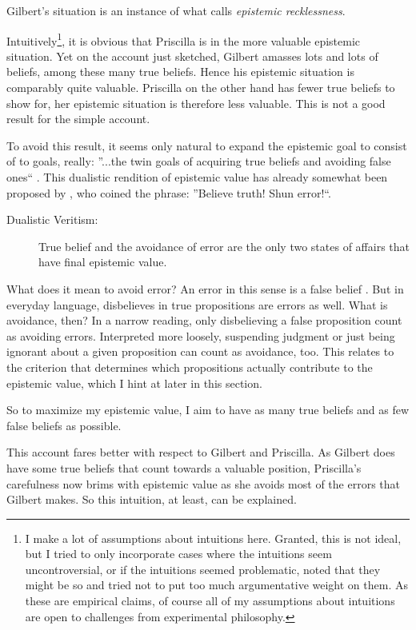\documentclass[12pt,numbers=noenddot]{scrartcl}
\begin{document}
Gilbert’s situation is an instance of what \textcite[360]{Berker2013-BERETA-2} calls \emph{epistemic recklessness}.

Intuitively\footnote{I make a lot of assumptions about intuitions here. Granted, this is not ideal, but I tried to only incorporate cases where the intuitions seem uncontroversial, or if the intuitions seemed problematic, noted that they might be so and tried not to put too much argumentative weight on them. As these are empirical claims, of course all of my assumptions about intuitions are open to challenges from experimental philosophy.},
it is obvious that Priscilla is in the more valuable epistemic situation. Yet on the account just sketched, Gilbert amasses lots and lots of beliefs, among these many true beliefs. Hence his epistemic situation is comparably quite valuable. Priscilla on the other hand has fewer true beliefs to show for, her epistemic situation is therefore less valuable. This is not a good result for the simple account.

To avoid this result, it seems only natural to expand the epistemic goal to consist of to goals, really: ”...the twin goals of acquiring true beliefs and avoiding false ones“ \textcite[339]{Berker2013-BERETA-2}. This dualistic rendition of epistemic value has already somewhat been proposed by \textcite[17]{James1896-JAMTWT-19}, who coined the phrase: ”Believe truth! Shun error!“.

\begin{description}
    \item[Dualistic Veritism:] True belief and the avoidance of error are the only two states of affairs that have final epistemic value.
\end{description}

What does it mean to avoid error? An error in this sense is a false belief \autocite[362]{Berker2013-BERETA-2}. But in everyday language, disbelieves in true propositions are errors as well. What is avoidance, then? In a narrow reading, only disbelieving a false proposition count as avoiding errors. Interpreted more loosely, suspending judgment or just being ignorant about a given proposition can count as avoidance, too. This relates to the criterion that determines which propositions actually contribute to the epistemic value, which I hint at later in this section.

So to maximize my epistemic value, I aim to have as many true beliefs and as few false beliefs as possible.

This account fares better with respect to Gilbert and Priscilla. As Gilbert does have some true beliefs that count towards a valuable position, Priscilla’s carefulness now brims with epistemic value as she avoids most of the errors that Gilbert makes. So this intuition, at least, can be explained.
\end{document}
